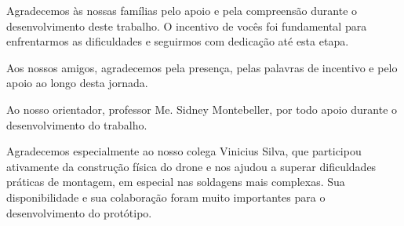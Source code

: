 \begin{agradecimentos}
    Agradecemos às nossas famílias pelo apoio e pela compreensão durante o
    desenvolvimento deste trabalho. O incentivo de vocês foi fundamental para
    enfrentarmos as dificuldades e seguirmos com dedicação até esta etapa.

    Aos nossos amigos, agradecemos pela presença, pelas palavras de incentivo e
    pelo apoio ao longo desta jornada.

    Ao nosso orientador, professor Me. Sidney Montebeller, por todo apoio durante o desenvolvimento do trabalho.

    Agradecemos especialmente ao nosso colega Vinicius Silva, que participou ativamente
    da construção física do drone e nos ajudou a superar dificuldades práticas
    de montagem, em especial nas soldagens mais complexas. Sua disponibilidade
    e sua colaboração foram muito importantes para o desenvolvimento do protótipo.
\end{agradecimentos}
